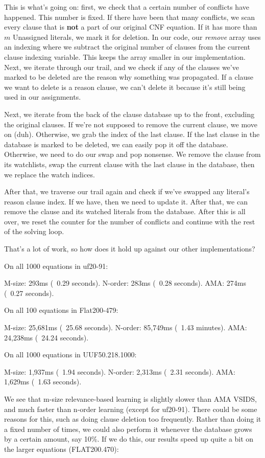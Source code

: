 \noindent
This is what's going on: first, we check that a certain number of conflicts have happened. 
This number is fixed. If there have been that many conflicts, we scan every clause that is 
\textbf{not} a part of our original CNF equation. If it has more than $m$ Unassigned literals, 
we mark it for deletion. In our code, our \textit{remove} array uses an indexing where we subtract 
the original number of clauses from the current clause indexing variable. This keeps the array 
smaller in our implementation. Next, we iterate through our trail, and we check if any of the 
clauses we've marked to be deleted are the reason why something was propagated. If a clause we 
want to delete is a reason clause, we can't delete it because it's still being used in our 
assignments. 

Next, we iterate from the back of the clause database up to the front, excluding the 
original clauses. If we're not supposed to remove the current clause, we move on (duh).
Otherwise, we grab the index of the last clause. If the last clause in the database is 
marked to be deleted, we can easily pop it off the database. Otherwise, we need to do 
our swap and pop nonsense. We remove the clause from its watchlists, swap the current 
clause with the last clause in the database, then we replace the watch indices. 

After that, we traverse our trail again and check if we've swapped any literal's 
reason clause index. If we have, then we need to update it. After that, we can 
remove the clause and its watched literals from the database. After this is all over,
we reset the counter for the number of conflicts and continue with the rest of the 
solving loop. 

That's a lot of work, so how does it hold up against our other implementations?
\begin{FVerbatim}
On all 1000 equations in uf20-91:

M-size:    293ms (~0.29 seconds).
N-order:   283ms (~0.28 seconds).
AMA:       274ms (~0.27 seconds).

On all 100 equations in Flat200-479:

M-size:    25,681ms (~25.68 seconds).
N-order:   85,749ms (~1.43 minutes).
AMA:       24,238ms (~24.24 seconds).

On all 1000 equations in UUF50.218.1000:

M-size:    1,937ms (~1.94 seconds).
N-order:   2,313ms (~2.31 seconds).
AMA:       1,629ms (~1.63 seconds).
\end{FVerbatim}
\noindent
We see that m-size relevance-based learning is slightly slower than AMA VSIDS, and much faster 
than n-order learning (except for uf20-91). There could be some reasons for this, such as doing 
clause deletion too frequently. Rather than doing it a fixed number of times, we could also 
perform it whenever the database grows by a certain amount, say 10\%. If we do this, our results 
speed up quite a bit on the larger equations (FLAT200.470):

